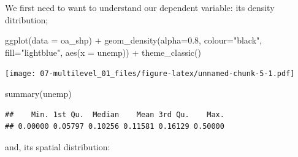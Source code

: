 \documentclass[
]{book}
\newenvironment{Shaded}{\begin{snugshade}}{\end{snugshade}}
\newcommand{\AttributeTok}[1]{\textcolor[rgb]{0.77,0.63,0.00}{#1}}
\newcommand{\FloatTok}[1]{\textcolor[rgb]{0.00,0.00,0.81}{#1}}
\newcommand{\FunctionTok}[1]{\textcolor[rgb]{0.00,0.00,0.00}{#1}}
\newcommand{\NormalTok}[1]{#1}
\newcommand{\SpecialCharTok}[1]{\textcolor[rgb]{0.00,0.00,0.00}{#1}}
\newcommand{\StringTok}[1]{\textcolor[rgb]{0.31,0.60,0.02}{#1}}
\begin{document}
We first need to want to understand our dependent variable: its density ditribution;

\begin{Shaded}
\begin{Highlighting}[]
\FunctionTok{ggplot}\NormalTok{(}\AttributeTok{data =}\NormalTok{ oa\_shp) }\SpecialCharTok{+}
\FunctionTok{geom\_density}\NormalTok{(}\AttributeTok{alpha=}\FloatTok{0.8}\NormalTok{, }\AttributeTok{colour=}\StringTok{"black"}\NormalTok{, }\AttributeTok{fill=}\StringTok{"lightblue"}\NormalTok{, }\FunctionTok{aes}\NormalTok{(}\AttributeTok{x =}\NormalTok{ unemp)) }\SpecialCharTok{+}
   \FunctionTok{theme\_classic}\NormalTok{()}
\end{Highlighting}
\end{Shaded}

\texttt{[image: 07-multilevel\_01\_files/figure-latex/unnamed-chunk-5-1.pdf]}

\begin{Shaded}
\begin{Highlighting}[]
\FunctionTok{summary}\NormalTok{(unemp)}
\end{Highlighting}
\end{Shaded}

\begin{verbatim}
##    Min. 1st Qu.  Median    Mean 3rd Qu.    Max. 
## 0.00000 0.05797 0.10256 0.11581 0.16129 0.50000
\end{verbatim}

and, its spatial distribution:
\end{document}
